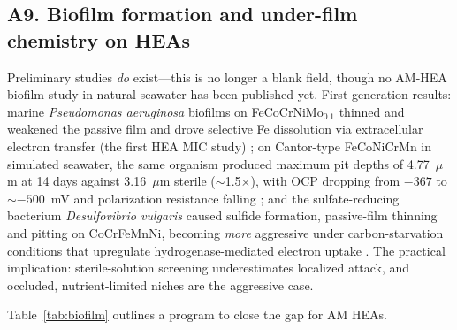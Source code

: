 \subsection{A9. Biofilm formation and under-film chemistry on HEAs}
\label{sec:a9}

Preliminary studies \emph{do} exist---this is no longer a blank field, though no AM-HEA biofilm study in natural seawater has been published yet. First-generation results: marine \emph{Pseudomonas aeruginosa} biofilms on FeCoCrNiMo$_{0.1}$ thinned and weakened the passive film and drove selective Fe dissolution via extracellular electron transfer (the first HEA MIC study) \cite{lou2020mic}; on Cantor-type FeCoNiCrMn in simulated seawater, the same organism produced maximum pit depths of 4.77~$\mu$m at 14 days against 3.16~$\mu$m sterile ($\sim$1.5$\times$), with OCP dropping from $-367$ to $\sim-500$~mV and polarization resistance falling \cite{mic_cantor2022}; and the sulfate-reducing bacterium \emph{Desulfovibrio vulgaris} caused sulfide formation, passive-film thinning and pitting on CoCrFeMnNi, becoming \emph{more} aggressive under carbon-starvation conditions that upregulate hydrogenase-mediated electron uptake \cite{wang2023srb}. The practical implication: sterile-solution screening underestimates localized attack, and occluded, nutrient-limited niches are the aggressive case.

Table~\ref{tab:biofilm} outlines a program to close the gap for AM HEAs.

